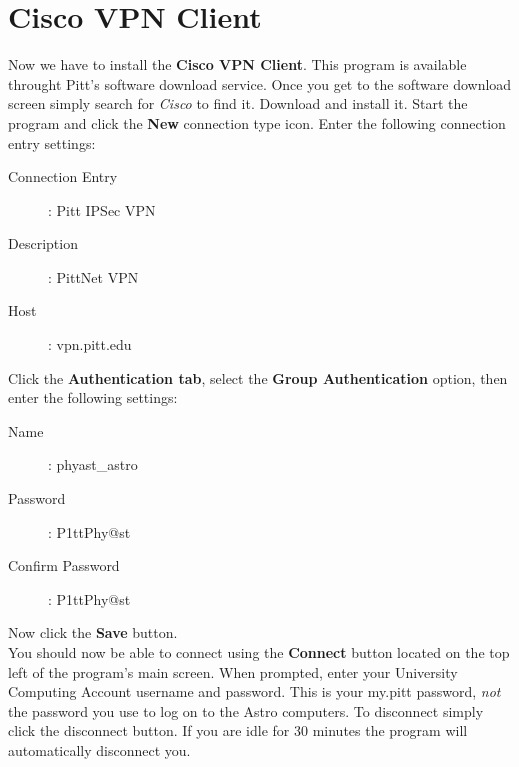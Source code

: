 \documentclass[11pt, preprint]{aastex}
\begin{document}
\section{Cisco VPN Client}
Now we have to install the \textbf{Cisco VPN Client}. This program is available throught Pitt's software download service. Once you get to the software download screen simply search for \emph{Cisco} to find it. Download and install it. Start the program and click the \textbf{New} connection type icon. Enter the following connection entry settings:
\begin{description}
\item[Connection Entry]: Pitt IPSec VPN
\item[Description]: PittNet VPN
\item[Host]: vpn.pitt.edu
\end{description}
Click the\textbf{ Authentication tab}, select the \textbf{Group Authentication} option, then enter the following settings:
\begin{description}
\item[Name]: phyast\_astro
\item[Password]: P1ttPhy{@}st
\item[Confirm Password]: P1ttPhy{@}st
\end{description}
Now click the \textbf{Save} button.
\\You should now be able to connect using the \textbf{Connect} button located on the top left of the program's main screen. When prompted, enter your University Computing Account username and password. This is your my.pitt password, \emph{not} the password you use to log on to the Astro computers. To disconnect simply click the disconnect button. If you are idle for 30 minutes the program will automatically disconnect you.
\end{document}
